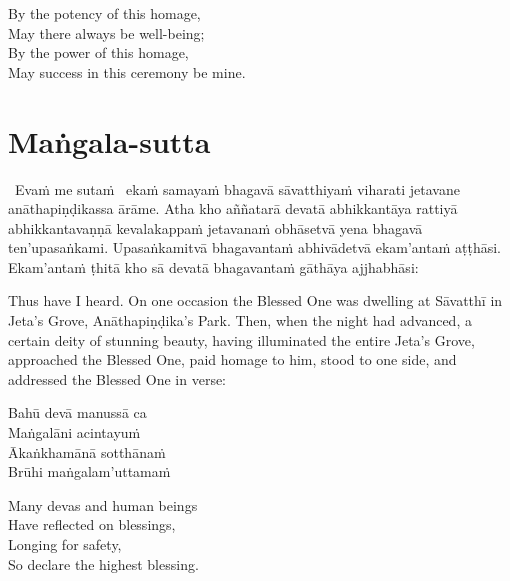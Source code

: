 \begin{english-verses}
  By the potency of this homage,\\
  May there always be well-being;\\
  By the power of this homage,\\
  May success in this ceremony be mine.
\end{english-verses}

\suttaRef{[Thai]}



\section{Maṅgala-sutta}
\label{mangala-sutta}

\begin{pali-hangtogether}
  \anglebracketleft\ \hspace{-0.5mm}Evaṁ me sutaṁ \hspace{-0.5mm}\anglebracketright\ ekaṁ samayaṁ bhagavā sāvatthiyaṁ viharati jetavane anāthapiṇḍikassa ārāme. Atha kho aññatarā devatā abhikkantāya rattiyā abhikkantavaṇṇā kevalakappaṁ jetavanaṁ obhāsetvā yena bhagavā ten'upasaṅkami. Upasaṅkamitvā bhagavantaṁ abhivādetvā ekam'antaṁ aṭṭhāsi. Ekam'antaṁ ṭhitā kho sā devatā bhagavantaṁ gāthāya ajjhabhāsi:
\end{pali-hangtogether}

\begin{english-verses}
  Thus have I heard. On one occasion the Blessed One was dwelling at Sāvatthī in Jeta's Grove, Anāthapiṇḍika's Park. Then, when the night had advanced, a certain deity of stunning beauty, having illuminated the entire Jeta's Grove, approached the Blessed One, paid homage to him, stood to one side, and addressed the Blessed One in verse:
\end{english-verses}

\begin{pali-hang}
  Bahū devā manussā ca\\
  Maṅgalāni acintayuṁ\\
  Ākaṅkhamānā sotthānaṁ\\
  Brūhi maṅgalam'uttamaṁ
\end{pali-hang}

\begin{english-verses}
  Many devas and human beings\\
  Have reflected on blessings,\\
  Longing for safety,\\
  So declare the highest blessing.
\end{english-verses}

